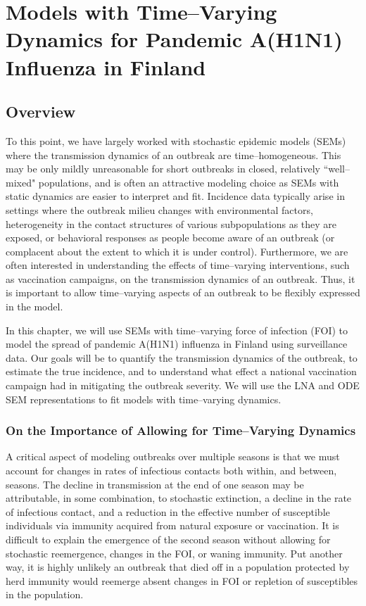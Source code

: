\chapter{Models with Time--Varying Dynamics for Pandemic A(H1N1) Influenza in Finland}
\label{chap:lna_extensions}

\section{Overview}
\label{sec:lna_extensions_overview}
To this point, we have largely worked with stochastic epidemic models (SEMs) where the transmission dynamics of an outbreak are time--homogeneous. This may be only mildly unreasonable for short outbreaks in closed, relatively ``well--mixed" populations, and is often an attractive modeling choice as SEMs with static dynamics are easier to interpret and fit. Incidence data typically arise in settings where the outbreak milieu changes with environmental factors, heterogeneity in the contact structures of various subpopulations as they are exposed, or behavioral responses as people become aware of an outbreak (or complacent about the extent to which it is under control). Furthermore, we are often interested in understanding the effects of time--varying interventions, such as vaccination campaigns, on the transmission dynamics of an outbreak. Thus, it is important to allow time--varying aspects of an outbreak to be flexibly expressed in the model.

In this chapter, we will use SEMs with time--varying force of infection (FOI) to model the spread of pandemic A(H1N1) influenza in Finland using surveillance data. Our goals will be to quantify the transmission dynamics of the outbreak, to estimate the true incidence, and to understand what effect a national vaccination campaign had in mitigating the outbreak severity. We will use the LNA and ODE SEM representations to fit models with time--varying dynamics. 


\subsection{On the Importance of Allowing for Time--Varying Dynamics}
\label{subsec:tparam_motivation}

A critical aspect of modeling outbreaks over multiple seasons is that we must account for changes in rates of infectious contacts both within, and between, seasons. The decline in transmission at the end of one season may be attributable, in some combination, to stochastic extinction, a decline in the rate of infectious contact, and a reduction in the effective number of susceptible individuals via immunity acquired from natural exposure or vaccination. It is difficult to explain the emergence of the second season without allowing for stochastic reemergence, changes in the FOI, or waning immunity. Put another way, it is highly unlikely an outbreak that died off in a population protected by herd immunity would reemerge absent changes in FOI or repletion of susceptibles in the population. 

